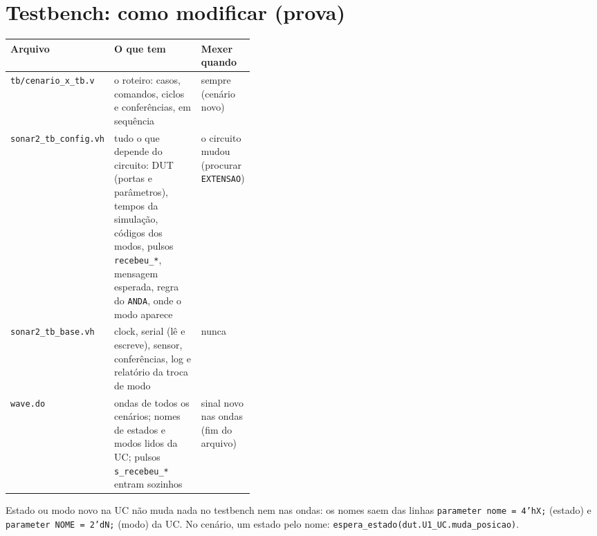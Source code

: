 \documentclass[9pt,a4paper]{extarticle}
\newcommand{\s}[1]{\texttt{#1}}          %
\begin{document}
\clearpage
\section{Testbench: como modificar (prova)}

\begin{tabularx}{\linewidth}{@{}>{\raggedright\arraybackslash}p{0.21\linewidth} Y >{\raggedright\arraybackslash}p{0.20\linewidth}@{}}
\toprule
Arquivo & O que tem & Mexer quando \\
\midrule
\s{tb/cenario\_x\_tb.v} & o roteiro: casos, comandos, ciclos e conferências, em sequência & sempre (cenário novo) \\
\s{sonar2\_tb\_config.vh} & tudo o que depende do circuito: DUT (portas e parâmetros), tempos da simulação, códigos dos modos, pulsos \s{recebeu\_*}, mensagem esperada, regra do \s{ANDA}, onde o modo aparece & o circuito mudou (procurar \s{EXTENSAO}) \\
\s{sonar2\_tb\_base.vh} & clock, serial (lê e escreve), sensor, conferências, log e relatório da troca de modo & nunca \\
\s{wave.do} & ondas de todos os cenários; nomes de estados e modos lidos da UC; pulsos \s{s\_recebeu\_*} entram sozinhos & sinal novo nas ondas (fim do arquivo) \\
\bottomrule
\end{tabularx}

Estado ou modo novo na UC não muda nada no testbench nem nas ondas: os nomes saem
das linhas \s{parameter nome = 4'hX;} (estado) e \s{parameter NOME = 2'dN;} (modo)
da UC. No cenário, um estado pelo nome: \s{espera\_estado(dut.U1\_UC.muda\_posicao)}.
\end{document}
